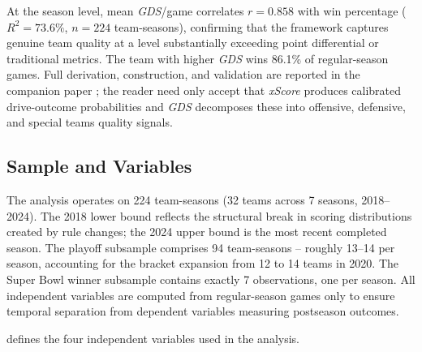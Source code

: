 \documentclass[12pt,a4paper]{article}
\newcommand{\xscore}{\textit{xScore}}
\newcommand{\gds}{\textit{GDS}}
\begin{document}
At the season level, mean \gds{}/game correlates $r = 0.858$ with win percentage ($R^2 = 73.6\%$, $n = 224$ team-seasons), confirming that the framework captures genuine team quality at a level substantially exceeding point differential or traditional metrics. The team with higher \gds{} wins 86.1\% of regular-season games. Full derivation, construction, and validation are reported in the companion paper \citep{mecha2026gds}; the reader need only accept that \xscore{} produces calibrated drive-outcome probabilities and \gds{} decomposes these into offensive, defensive, and special teams quality signals.

\subsection{Sample and Variables}
\label{sec:sample}

The analysis operates on 224 team-seasons (32 teams across 7 seasons, 2018--2024). The 2018 lower bound reflects the structural break in scoring distributions created by rule changes; the 2024 upper bound is the most recent completed season. The playoff subsample comprises 94 team-seasons -- roughly 13--14 per season, accounting for the bracket expansion from 12 to 14 teams in 2020. The Super Bowl winner subsample contains exactly 7 observations, one per season. All independent variables are computed from regular-season games only to ensure temporal separation from dependent variables measuring postseason outcomes.

 defines the four independent variables used in the analysis.
\end{document}
